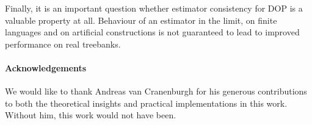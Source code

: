 Finally, it is an important question whether estimator consistency for DOP is a valuable property at all. Behaviour of an estimator in the limit, on finite languages and on artificial constructions is not guaranteed to lead to improved performance on real treebanks. 

\paragraph{Acknowledgements}
We would like to thank Andreas van Cranenburgh for his generous contributions to both the theoretical insights and practical implementations in this work. Without him, this work would not have been.
